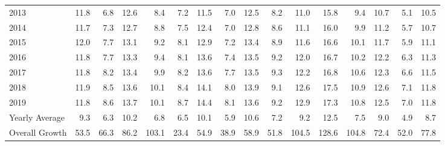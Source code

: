 \begin{tabular}{lrrrrrrrrrrrrrrr}
2013                    &     11.8 &              6.8 &          12.6 &        8.4 &            7.2 &            11.5 &          7.0 &        12.5 &          8.2 &      11.0 &          15.8 &            9.4 &     10.7 &          5.1 &  10.5 \\
2014                    &     11.7 &              7.3 &          12.7 &        8.8 &            7.5 &            12.4 &          7.0 &        12.8 &          8.6 &      11.1 &          16.0 &            9.9 &     11.2 &          5.7 &  10.7 \\
2015                    &     12.0 &              7.7 &          13.1 &        9.2 &            8.1 &            12.9 &          7.2 &        13.4 &          8.9 &      11.6 &          16.6 &           10.1 &     11.7 &          5.9 &  11.1 \\
2016                    &     11.8 &              7.7 &          13.3 &        9.4 &            8.1 &            13.6 &          7.4 &        13.5 &          9.2 &      12.0 &          16.7 &           10.2 &     12.2 &          6.3 &  11.3 \\
2017                    &     11.8 &              8.2 &          13.4 &        9.9 &            8.2 &            13.6 &          7.7 &        13.5 &          9.3 &      12.2 &          16.8 &           10.6 &     12.3 &          6.6 &  11.5 \\
2018                    &     11.9 &              8.5 &          13.6 &       10.1 &            8.4 &            14.1 &          8.0 &        13.9 &          9.1 &      12.6 &          17.5 &           10.9 &     12.6 &          7.1 &  11.8 \\
2019                    &     11.8 &              8.6 &          13.7 &       10.1 &            8.7 &            14.4 &          8.1 &        13.6 &          9.2 &      12.9 &          17.3 &           10.8 &     12.5 &          7.0 &  11.8 \\
\midrule Yearly Average &      9.3 &              6.3 &          10.2 &        6.8 &            6.5 &            10.1 &          5.9 &        10.6 &          7.2 &       9.2 &          12.5 &            7.5 &      9.0 &          4.9 &   8.7 \\
Overall Growth          &     53.5 &             66.3 &          86.2 &      103.1 &           23.4 &            54.9 &         38.9 &        58.9 &         51.8 &     104.5 &         128.6 &          104.8 &     72.4 &         52.0 &  77.8 \\
\bottomrule
\end{tabular}
